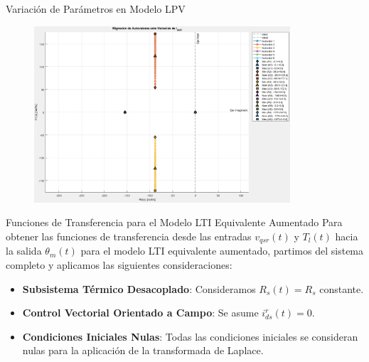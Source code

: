 \documentclass[12pt]{beamer}
\begin{document}
\begin{frame}{Variación de Parámetros en Modelo LPV}
    \begin{figure}[H]
    \centering
    \includegraphics[width=0.85\textwidth]{Imagenes/MigracionLPV_2.png}
    \label{fig:migracion_polos_i_ds}
    \end{figure}
\end{frame}

\begin{frame}{\small Funciones de Transferencia para el Modelo LTI Equivalente Aumentado}\small
    Para obtener las funciones de transferencia desde las entradas \( v_{qsr}(t) \) y \( T_l(t) \) hacia la salida \( \theta_m(t) \) para el modelo LTI equivalente aumentado, partimos del sistema completo y aplicamos las siguientes consideraciones:
    
    \begin{itemize}
    \item \textbf{Subsistema Térmico Desacoplado}: Consideramos \( R_s(t) = R_s \) constante.
    \item \textbf{Control Vectorial Orientado a Campo}: Se asume \( i_{ds}^r(t) = 0 \).
    \item \textbf{Condiciones Iniciales Nulas}: Todas las condiciones iniciales se consideran nulas para la aplicación de la transformada de Laplace.
    \end{itemize}
\end{frame}
\end{document}
